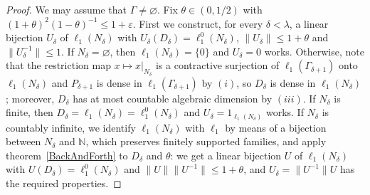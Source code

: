 \documentclass[12pt]{article}
\newcommand{\lo}[1]{\ell_1^0(#1)}
\newcommand{\ellone}[1]{\ell_1(#1)}
\newcommand{\norm}[1]{\lVert #1\rVert}
\begin{document}
\begin{proof} We may assume that $\Gamma\neq\varnothing$. Fix $\theta\in(0,1/2)$ with
    ${(1+\theta)}^2{(1-\theta)}^{-1}\leq 1+\varepsilon$. First we construct,
    for every $\delta<\lambda$, a linear bijection $U_\delta$ of
    $\ellone{N_\delta}$ with $U_\delta(D_\delta)=\lo{N_\delta}$,
    $\norm{U_\delta}\leq 1+\theta$ and $\norm{U_\delta^{-1}}\leq 1$. If
    $N_\delta=\varnothing$, then $\ellone{N_\delta}=\{0\}$ and $U_\delta=0$
    works. Otherwise, note that the restriction map $x\mapsto x|_{N_\delta}$
    is a contractive surjection of $\ellone{\Gamma_{\delta+1}}$ onto
    $\ellone{N_\delta}$ and $P_{\delta+1}$ is dense in
    $\ellone{\Gamma_{\delta+1}}$ by $(i)$, so $D_\delta$ is dense in
    $\ellone{N_\delta}$; moreover, $D_\delta$ has at most countable algebraic
    dimension by $(iii)$. If $N_\delta$ is finite, then
    $D_\delta=\ellone{N_\delta}=\lo{N_\delta}$ and $U_\delta=1_{\ellone{N_\delta}}$
    works. If $N_\delta$ is countably infinite, we identify
    $\ellone{N_\delta}$ with $\ell_1$ by means of a bijection between
    $N_\delta$ and $\mathbb{N}$, which preserves finitely supported families,
    and apply theorem~\ref{BackAndForth} to $D_\delta$ and $\theta$: we get a
    linear bijection $U$ of $\ellone{N_\delta}$ with $U(D_\delta)=\lo{N_\delta}$
    and $\norm{U}\norm{U^{-1}}\leq 1+\theta$, and $U_\delta=\norm{U^{-1}}U$
    has the required properties.


\end{proof}
\end{document}
